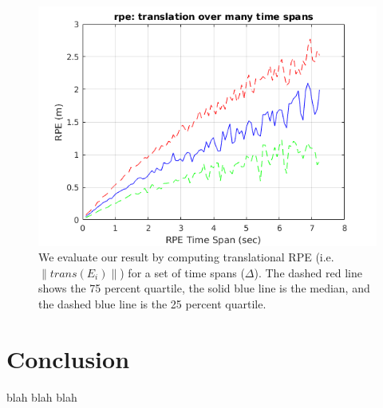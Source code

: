 \documentclass[11pt,a4paper]{article}
\begin{document}
\begin{figure}
	\centering
	\includegraphics[scale=0.6]{example_result}
	\caption{We evaluate our result by computing translational RPE (i.e. $\|trans(E_i)\|$) for a set of time spans ($\Delta$). The dashed red line shows the 75 percent quartile, the solid blue line is the median, and the dashed blue line is the 25 percent quartile.}
	\label{fig:exampleresult}
\end{figure}

\section{Conclusion}

blah blah blah 



\end{document}
